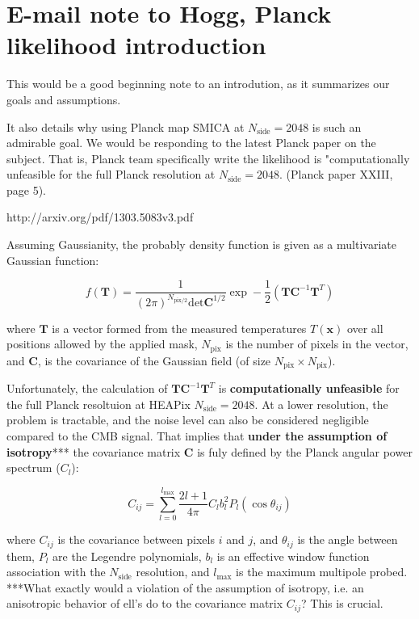 \documentclass[a4paper, 11pt]{article}
\begin{document}

\section*{E-mail note to Hogg, Planck likelihood introduction}

This would be a good beginning note to an introdution, as it summarizes our goals and assumptions.
 
It also details why using Planck map SMICA at $N_{\text{side}}=2048$ is such an admirable goal. We would be responding to the latest Planck paper on the subject. That is, Planck team specifically write the likelihood is "computationally unfeasible for the full Planck resolution at $N_{\text{side}}=2048$. (Planck paper XXIII, page 5). 

http://arxiv.org/pdf/1303.5083v3.pdf

Assuming Gaussianity, the probably density function is given as a multivariate Gaussian function: 

$$
f(\textbf{T})=\frac{1}{(2\pi)^{N_{\text{pix}/2}}\text{det}\textbf{C}^{1/2}}\exp-\frac{1}{2}(\textbf{T}\textbf{C}^{-1}\textbf{T}^{T})
$$


where $\textbf{T}$ is a vector formed from the measured temperatures $T(\textbf{x})$ over all positions allowed by the applied mask, $N_{\text{pix}}$ is the number of pixels in the vector, and $\textbf{C}$, is the covariance of the Gaussian field (of size $N_{\text{pix}}\times N_{\text{pix}}$). 

Unfortunately, the calculation of $\textbf{T}\textbf{C}^{-1}\textbf{T}^{T}$ is \textbf{computationally unfeasible} for the full Planck resoltuion at HEAPix $N_{\text{side}}=2048$. At a lower resolution, the problem is tractable, and the noise level can also be considered negligible compared to the CMB signal. That implies that \textbf{under the assumption of isotropy}*** the covariance matrix $\textbf{C}$ is fuly defined by the Planck angular power spectrum ($C_l$): 

$$
C_{ij}=\sum^{l_{\text{max}}}_{l=0}\frac{2l+1}{4\pi}C_l b^2_l P_l(\cos\theta_{ij})
$$

where $C_{ij}$ is the covariance between pixels $i$ and $j$, and $\theta_{ij}$ is the angle between them, $P_l$ are the Legendre polynomials, $b_l$ is an effective window function association with the $N_{\text{side}}$ resolution, and $l_{\text{max}}$ is the maximum multipole probed.  \\

***What exactly would a violation of the assumption of isotropy, i.e. an anisotropic behavior of ell's do to the covariance matrix $C_{ij}$? This is crucial. 
\end{document}
